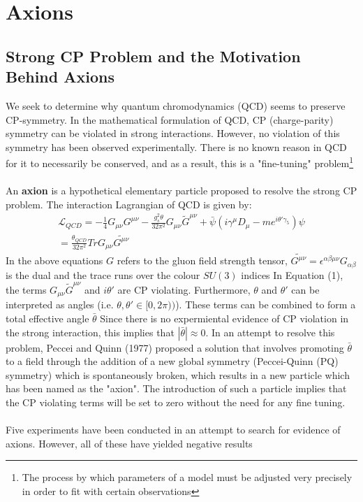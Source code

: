 \documentclass{article}
\begin{document}
\section{Axions}
\subsection{Strong CP Problem and the Motivation Behind Axions}
We seek to determine why quantum chromodynamics (QCD) seems to preserve CP-symmetry. In the mathematical formulation of QCD, CP (charge-parity) symmetry can be violated in strong interactions.
However, no violation of this symmetry has been observed experimentally. There is no known reason in QCD for it to necessarily be conserved, and as a result, this is a "fine-tuning" problem\footnote{The process by which parameters of a model must be adjusted very precisely in order to fit with certain observations}\\
\\
An \textbf{axion} is a hypothetical elementary particle proposed to 
resolve the strong CP problem. The interaction Lagrangian of QCD is given by:
\begin{eqnarray}
    \mathcal{L}_{QCD} = -\frac{1}{4}G_{\mu\nu}G^{\mu\nu}-\frac{g_{s}^{2}\theta}{32\pi^{2}}G_{\mu\nu}\tilde{G}^{\mu\nu}+\bar{\psi}(i\gamma^{\mu}D_{\mu}-me^{i\theta'\gamma_{5}})\psi\\
    = \frac{\theta_{QCD}}{32\pi^{2}} Tr G_{\mu\nu}\tilde{G^{\mu\nu}}
\end{eqnarray}
In the above equations $G$ refers to the gluon field strength tensor, $\tilde{G^{\mu\nu}} = \epsilon^{\alpha\beta\mu\nu}G_{\alpha\beta}$ is the dual and the trace runs over the colour $SU(3)$ indices
In Equation (1), the terms $G_{\mu\nu}\tilde{G}^{\mu\nu}$ and $i\theta'$ are CP violating. Furthermore, $\theta$ and $\theta'$ can be interpreted as angles (i.e. $\theta, \theta'\in[0,2\pi))$). These terms can be combined to form a total effective angle $\bar{\theta}$
Since there is no expermiental evidence of CP violation in the strong interaction, this implies that $|\bar{\theta}|\approx 0$. In an attempt to resolve this problem, Peccei and Quinn (1977) proposed a solution that involves promoting $\bar{\theta}$ to a field through the addition of 
a new global symmetry (Peccei-Quinn (PQ) symmetry) which is spontaneously broken, which results in a new particle which has been named as the "axion". The introduction of such a particle implies that the CP violating terms will be set to zero without the need for any fine tuning.\\
\\
Five experiments have been conducted in an attempt to search for evidence of axions. However, all of these have yielded negative results
\end{document}
